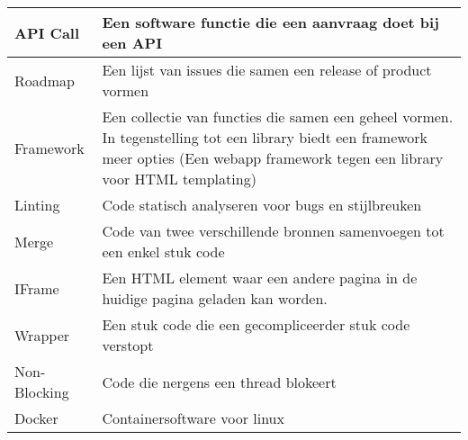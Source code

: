 \begin{tabular}{|p{3cm}|p{11cm}|}
	API Call & Een software functie die een aanvraag doet bij een API \\ \hline
	Roadmap & Een lijst van issues die samen een release of product vormen \\ \hline
	Framework & Een collectie van functies die samen een geheel vormen. In tegenstelling tot een library biedt een framework meer  opties (Een webapp framework tegen een library voor HTML templating) \\ \hline
	Linting & Code statisch analyseren voor bugs en stijlbreuken \\ \hline
	Merge & Code van twee verschillende bronnen samenvoegen tot een enkel stuk code \\ \hline
	IFrame & Een HTML element waar een andere pagina in de huidige pagina geladen kan worden. \\ \hline
	Wrapper & Een stuk code die een gecompliceerder stuk code verstopt \\ \hline
	Non-Blocking & Code die nergens een thread blokeert \\ \hline
	Docker & Containersoftware voor linux \\ \hline
\end{tabular}